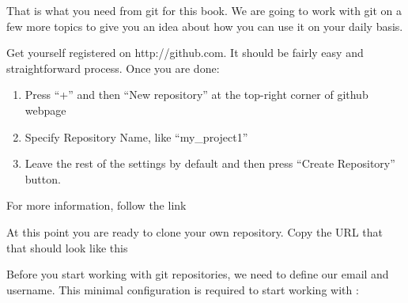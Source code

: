 
That is what you need from git for this book. We are going to work with git on a few more topics to give you an idea about how you can use it on your daily basis.




Get yourself registered on http://github.com. It should be fairly easy and straightforward process. Once you are done:
\begin{enumerate}
\item Press “+” and then “New repository” at the top-right corner of github webpage
\item Specify Repository Name, like “my\_project1”
\item Leave the rest of the settings by default and then press “Create Repository” button.
\end{enumerate}

For more information, follow the link 

At this point you are ready to clone your own repository. Copy the URL that that should look like this 





Before you start working with git repositories, we need to define our email and username. This minimal configuration is required to start working with :

